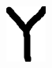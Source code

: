 \documentclass[russian,utf8,emptystyle]{eskdtext}
\begin{document}
\begin{figure}[!htb]
\includegraphics[width=\linewidth]{../data/learn/y/001}
\endminipage\hfill
{}

\end{figure}
\end{document}
